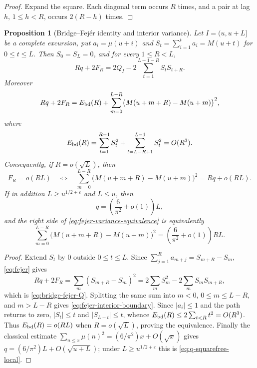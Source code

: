 \documentclass[11pt]{amsart}
\numberwithin{equation}{section}
\theoremstyle{plain}
\newtheorem{proposition}[theorem]{Proposition}
\theoremstyle{definition}
\theoremstyle{remark}
\newcommand{\eps}{\varepsilon}
\begin{document}
\begin{proof}
Expand the square. Each diagonal term occurs $R$ times, and a pair at lag
$h$, $1\le h<R$, occurs $2(R-h)$ times.
\end{proof}

\begin{proposition}[Bridge--Fej\'er identity and interior variance]
\label{prop:bridge-fejer}
Let $I=(u,u+L]$ be a complete excursion, put
$a_i=\mu(u+i)$ and
$S_t=\sum_{i=1}^ta_i=M(u+t)$ for $0\le t\le L$. Then
$S_0=S_L=0$, and for every $1\le R<L$,
\begin{equation}
\label{eq:bridge-fejer-Q}
Rq+2F_R
=2Q_I-2\sum_{t=1}^{L-1-R}S_tS_{t+R}.
\end{equation}
Moreover
\begin{equation}
\label{eq:fejer-interior-boundary}
Rq+2F_R
=E_{\rm bd}(R)
+\sum_{m=0}^{L-R}\bigl(M(u+m+R)-M(u+m)\bigr)^2,
\end{equation}
where
\[
E_{\rm bd}(R)=\sum_{t=1}^{R-1}S_t^2
+\sum_{t=L-R+1}^{L-1}S_t^2
=O(R^3).
\]
Consequently, if $R=o(\sqrt L)$, then
\begin{equation}
\label{eq:fejer-variance-equivalence}
F_R=o(RL)
\quad\Longleftrightarrow\quad
\sum_{m=0}^{L-R}\bigl(M(u+m+R)-M(u+m)\bigr)^2
=Rq+o(RL).
\end{equation}
If in addition $L\ge u^{1/2+\eps}$ and $L\le u$, then
\begin{equation}
\label{eq:q-squarefree-local}
q=\left(\frac6{\pi^2}+o(1)\right)L,
\end{equation}
and the right side of \eqref{eq:fejer-variance-equivalence} is equivalently
\begin{equation}
\label{eq:local-variance-diagonal}
\sum_{m=0}^{L-R}\bigl(M(u+m+R)-M(u+m)\bigr)^2
=\left(\frac6{\pi^2}+o(1)\right)RL.
\end{equation}
\end{proposition}

\begin{proof}
Extend $S_t$ by $0$ outside $0\le t\le L$. Since
$\sum_{j=1}^Ra_{m+j}=S_{m+R}-S_m$, \eqref{eq:fejer} gives
\[
Rq+2F_R=\sum_m(S_{m+R}-S_m)^2
=2\sum_mS_m^2-2\sum_mS_mS_{m+R},
\]
which is \eqref{eq:bridge-fejer-Q}. Splitting the same sum into
$m<0$, $0\le m\le L-R$, and $m>L-R$ gives
\eqref{eq:fejer-interior-boundary}. Since $|a_i|\le1$ and the path returns
to zero, $|S_t|\le t$ and $|S_{L-t}|\le t$, whence
$E_{\rm bd}(R)\le2\sum_{t<R}t^2=O(R^3)$. Thus
$E_{\rm bd}(R)=o(RL)$ when $R=o(\sqrt L)$, proving the equivalence.
Finally the classical estimate
$\sum_{n\le x}\mu(n)^2=(6/\pi^2)x+O(\sqrt x)$ gives
$q=(6/\pi^2)L+O(\sqrt{u+L})$; under $L\ge u^{1/2+\eps}$ this is
\eqref{eq:q-squarefree-local}.
\end{proof}
\end{document}
